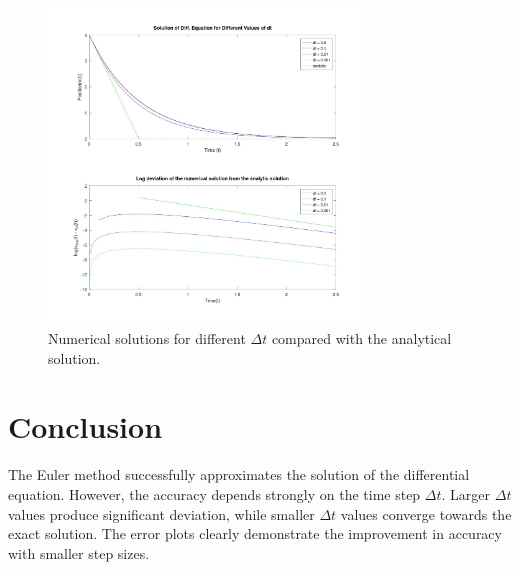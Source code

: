 \begin{figure}[h!]
    \centering
    \includegraphics[width=0.75\textwidth]{a2.jpg}
    \caption{Numerical solutions for different $\Delta t$ compared with the analytical solution.}
\end{figure}

\section*{Conclusion}
The Euler method successfully approximates the solution of the differential equation. However, the accuracy depends strongly on the time step $\Delta t$. Larger $\Delta t$ values produce significant deviation, while smaller $\Delta t$ values converge towards the exact solution. The error plots clearly demonstrate the improvement in accuracy with smaller step sizes.
